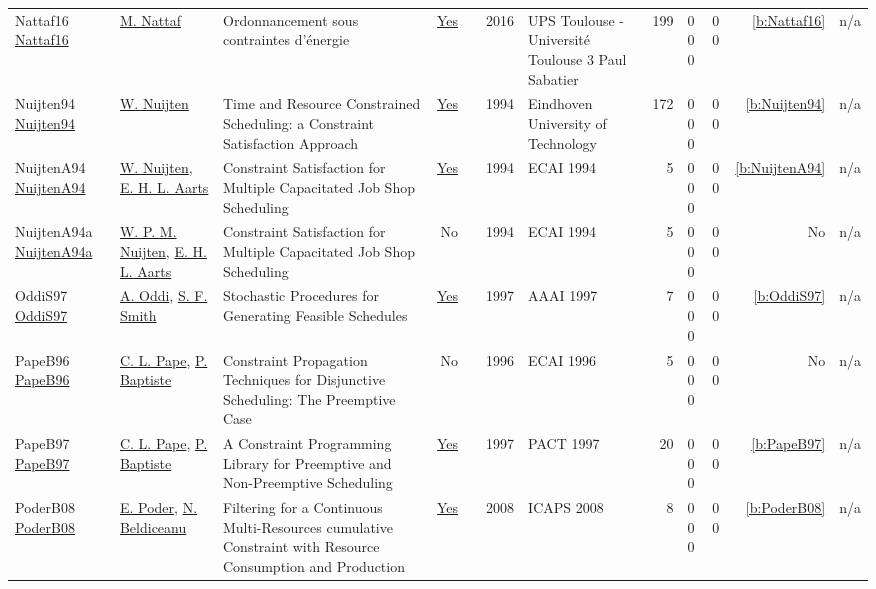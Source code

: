 {\begin{longtable}{>{\raggedright\arraybackslash}p{3cm}>{\raggedright\arraybackslash}p{4.5cm}>{\raggedright\arraybackslash}p{6.0cm}rrrp{2.5cm}rp{1cm}p{1cm}rr}
Nattaf16 \href{https://laas.hal.science/tel-01417288}{Nattaf16} & \hyperref[auth:a81]{M. Nattaf} & {Ordonnancement sous contraintes d'{\'e}nergie} & \href{../works/Nattaf16.pdf}{Yes} & \cite{Nattaf16} & 2016 & {UPS Toulouse - Universit{\'e} Toulouse 3 Paul Sabatier} & 199 & 0 0 0 & 0 0 & \ref{b:Nattaf16} & n/a\\
Nuijten94 \href{https://pure.tue.nl/ws/portalfiles/portal/2374269/431902.pdf}{Nuijten94} & \hyperref[auth:a656]{W. Nuijten} & Time and Resource Constrained Scheduling: a Constraint Satisfaction Approach & \href{../works/Nuijten94.pdf}{Yes} & \cite{Nuijten94} & 1994 & Eindhoven University of Technology & 172 & 0 0 0 & 0 0 & \ref{b:Nuijten94} & n/a\\
NuijtenA94 \href{}{NuijtenA94} & \hyperref[auth:a656]{W. Nuijten}, \hyperref[auth:a777]{E. H. L. Aarts} & Constraint Satisfaction for Multiple Capacitated Job Shop Scheduling & \href{../works/NuijtenA94.pdf}{Yes} & \cite{NuijtenA94} & 1994 & ECAI 1994 & 5 & 0 0 0 & 0 0 & \ref{b:NuijtenA94} & n/a\\
NuijtenA94a \href{}{NuijtenA94a} & \hyperref[auth:a1257]{W. P. M. Nuijten}, \hyperref[auth:a777]{E. H. L. Aarts} & Constraint Satisfaction for Multiple Capacitated Job Shop Scheduling & No & \cite{NuijtenA94a} & 1994 & ECAI 1994 & 5 & 0 0 0 & 0 0 & No & n/a\\
OddiS97 \href{http://www.aaai.org/Library/AAAI/1997/aaai97-048.php}{OddiS97} & \hyperref[auth:a282]{A. Oddi}, \hyperref[auth:a298]{S. F. Smith} & Stochastic Procedures for Generating Feasible Schedules & \href{../works/OddiS97.pdf}{Yes} & \cite{OddiS97} & 1997 & AAAI 1997 & 7 & 0 0 0 & 0 0 & \ref{b:OddiS97} & n/a\\
PapeB96 \href{}{PapeB96} & \hyperref[auth:a163]{C. L. Pape}, \hyperref[auth:a162]{P. Baptiste} & Constraint Propagation Techniques for Disjunctive Scheduling: The Preemptive Case & No & \cite{PapeB96} & 1996 & ECAI 1996 & 5 & 0 0 0 & 0 0 & No & n/a\\
PapeB97 \href{}{PapeB97} & \hyperref[auth:a163]{C. L. Pape}, \hyperref[auth:a162]{P. Baptiste} & A Constraint Programming Library for Preemptive and Non-Preemptive Scheduling & \href{../works/PapeB97.pdf}{Yes} & \cite{PapeB97} & 1997 & PACT 1997 & 20 & 0 0 0 & 0 0 & \ref{b:PapeB97} & n/a\\
PoderB08 \href{http://www.aaai.org/Library/ICAPS/2008/icaps08-033.php}{PoderB08} & \hyperref[auth:a358]{E. Poder}, \hyperref[auth:a128]{N. Beldiceanu} & Filtering for a Continuous Multi-Resources cumulative Constraint with Resource Consumption and Production & \href{../works/PoderB08.pdf}{Yes} & \cite{PoderB08} & 2008 & ICAPS 2008 & 8 & 0 0 0 & 0 0 & \ref{b:PoderB08} & n/a\\

\end{longtable}}
